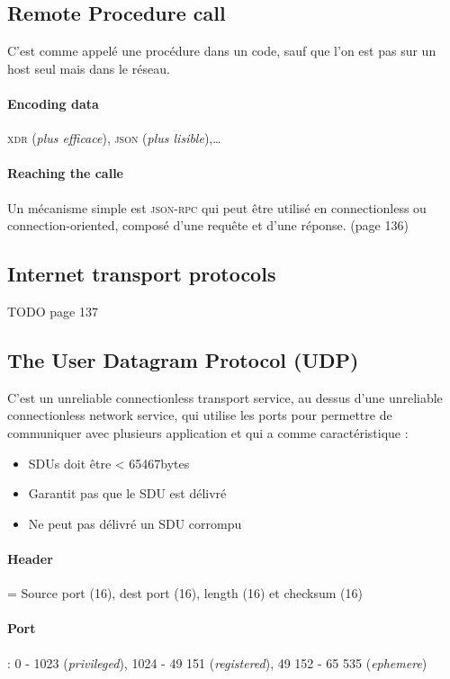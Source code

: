 \subsection{Remote Procedure call}
C'est comme appelé une procédure dans un code, sauf que l'on est pas sur
un host seul mais dans le réseau.

\paragraph{Encoding data}
\textsc{xdr} (\textit{plus efficace}), \textsc{json} (\textit{plus lisible}),\ldots

\paragraph{Reaching the calle}
Un mécanisme simple est \textsc{json-rpc} qui peut être utilisé en connectionless ou
connection-oriented, composé d'une requête et d'une réponse. (page 136)

\subsection{Internet transport protocols}
TODO page 137

\subsection{The User Datagram Protocol (UDP)}

C'est un unreliable connectionless transport service, au dessus d'une unreliable
connectionless network service, qui utilise les ports
pour permettre de communiquer avec plusieurs application et qui a comme
caractéristique :
\begin{itemize}
    \item SDUs doit être < 65467bytes
    \item Garantit pas que le SDU est délivré
    \item Ne peut pas délivré un SDU corrompu
\end{itemize}

\paragraph{Header} = Source port (16), dest port (16), length (16) et checksum (16)

\paragraph{Port} : 0 - 1023 (\textit{privileged}), 1024 - 49 151 (\textit{registered}),
49 152 - 65 535 (\textit{ephemere})

